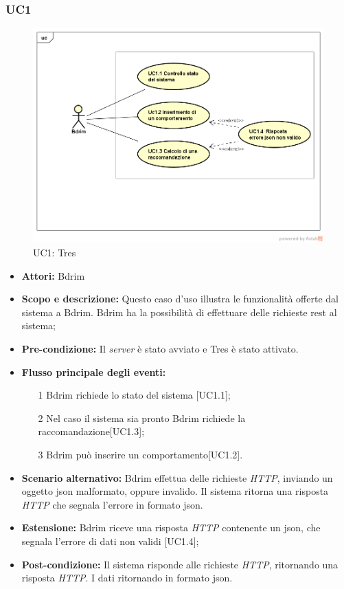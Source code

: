 \subsubsection{UC1}
\begin{figure}[h]
\centering
\includegraphics[scale=0.42]{immagini/UC1a}
\caption{UC1: Tres}
\label{fig:UC1}
\end{figure}
\begin{itemize}
\item \textbf{Attori:} Bdrim
\item \textbf{Scopo e descrizione:} Questo caso d'uso illustra le funzionalità offerte dal sistema a Bdrim. Bdrim ha la possibilità di effettuare delle richieste \gls{rest} al sistema;
\item \textbf{Pre-condizione:} Il \emph{server} è stato avviato e Tres è stato attivato.
\item \textbf{Flusso principale degli eventi:}
\begin{itemize}
\item[1] Bdrim richiede lo stato del sistema [UC1.1];
\item[2] Nel caso il sistema sia pronto Bdrim richiede la raccomandazione[UC1.3];
\item[3] Bdrim può inserire un comportamento[UC1.2].
\end{itemize}
\item \textbf{Scenario alternativo:} Bdrim effettua delle richieste \emph{HTTP}, inviando un oggetto \gls{json} malformato, oppure invalido. Il sistema ritorna una risposta \emph{HTTP} che segnala l'errore in formato \gls{json}. 
\item \textbf{Estensione:} Bdrim riceve una risposta \emph{HTTP} contenente un \gls{json}, che segnala l'errore di dati non validi [UC1.4];
\item \textbf{Post-condizione:} Il sistema risponde alle richieste \emph{HTTP}, ritornando una risposta \emph{HTTP}. I dati ritornando in formato \gls{json}.
\end{itemize}




